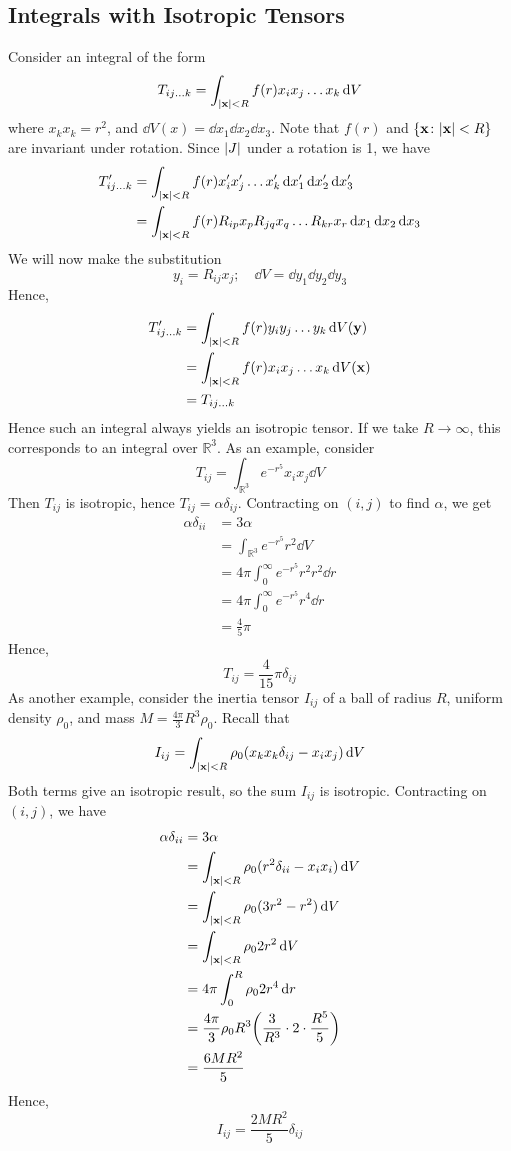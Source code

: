 \documentclass{article}
\begin{document}
\subsection{Integrals with Isotropic Tensors}
Consider an integral of the form
\[ T_{ij\dots k} = \int_{\abs{\vb x} < R} f(r) x_i x_j \dots x_k \dd{V} \]
where $x_k x_k = r^2$, and $\dd{V(x)} = \dd{x_1} \dd{x_2} \dd{x_3}$. Note that $f(r)$ and $\{ \vb x \colon \abs{\vb x} < R \}$ are invariant under rotation. Since $\abs{J}$ under a rotation is 1, we have
\begin{align*}
	T_{ij\dots k}' &= \int_{\abs{\vb x} < R} f(r) x_i' x_j' \dots x_k' \dd{x_1'} \dd{x_2'} \dd{x_3'} \\
	&= \int_{\abs{\vb x} < R} f(r) R_{ip} x_p R_{jq} x_q \dots R_{kr} x_r \dd{x_1} \dd{x_2} \dd{x_3}
\end{align*}
We will now make the substitution
\[ y_i = R_{ij} x_j;\quad \dd{V} = \dd{y_1} \dd{y_2} \dd{y_3} \]
Hence,
\begin{align*}
	T_{ij\dots k}' &= \int_{\abs{\vb x} < R} f(r) y_i y_j \dots y_k \dd{V(\vb y)} \\
	&= \int_{\abs{\vb x} < R} f(r) x_i x_j \dots x_k \dd{V(\vb x)} \\
	&= T_{ij\dots k}
\end{align*}
Hence such an integral always yields an isotropic tensor. If we take $R \to \infty$, this corresponds to an integral over $\mathbb R^3$. As an example, consider
\[ T_{ij} = \int_{\mathbb R^3} e^{-r^5}x_i x_j \dd{V} \]
Then $T_{ij}$ is isotropic, hence $T_{ij} = \alpha \delta_{ij}$. Contracting on $(i, j)$ to find $\alpha$, we get
\begin{align*}
	\alpha \delta_{ii} &= 3\alpha \\
	&= \int_{\mathbb R^3} e^{-r^5} r^2 \dd{V} \\
	&= 4\pi \int_{0}^\infty e^{-r^5} r^2 r^2 \dd{r} \\
	&= 4\pi \int_{0}^\infty e^{-r^5} r^4 \dd{r} \\
	&= \frac{4}{5}\pi
\end{align*}
Hence,
\[ T_{ij} = \frac{4}{15}\pi\delta_{ij} \]
As another example, consider the inertia tensor $I_{ij}$ of a ball of radius $R$, uniform density $\rho_0$, and mass $M = \frac{4\pi}{3}R^3 \rho_0$. Recall that
\[ I_{ij} = \int_{\abs{\vb x} < R} \rho_0 (x_k x_k \delta_{ij} - x_i x_j) \dd{V} \]
Both terms give an isotropic result, so the sum $I_{ij}$ is isotropic. Contracting on $(i, j)$, we have
\begin{align*}
	\alpha \delta_{ii} &= 3\alpha \\
	&= \int_{\abs{\vb x} < R} \rho_0 (r^2 \delta_{ii} - x_i x_i) \dd{V} \\
	&= \int_{\abs{\vb x} < R} \rho_0 (3r^2 - r^2) \dd{V} \\
	&= \int_{\abs{\vb x} < R} \rho_0 2r^2 \dd{V} \\
	&= 4\pi \int_0^R \rho_0 2r^4 \dd{r} \\
	&= \frac{4\pi}{3}\rho_0 R^3 \qty(\frac{3}{R^3} \cdot 2 \cdot \frac{R^5}{5}) \\
	&= \frac{6MR^2}{5}
\end{align*}
Hence,
\[ I_{ij} = \frac{2MR^2}{5}\delta_{ij} \]
\end{document}
